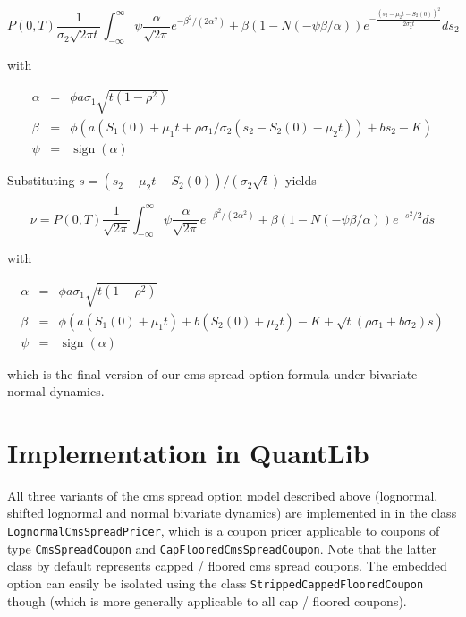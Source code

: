 \documentclass{amsart}
\theoremstyle{plain}
\numberwithin{equation}{section}
\DeclareMathOperator{\sign}{sign}
\begin{document}
\begin{equation}
P(0,T) \frac{1}{\sigma_2\sqrt{2\pi t}} \int_{-\infty}^\infty \psi\frac{\alpha}{\sqrt{2\pi}}e^{-\beta^2/(2\alpha^2)}+\beta(1-N(-\psi\beta/\alpha))e^{-\frac{(s_2-\mu_2t-S_2(0))^2}{2\sigma_2^2 t}} ds_2
\end{equation}

with

\begin{eqnarray}
\alpha &=& \phi a \sigma_1 \sqrt{t(1-\rho^2)} \\
\beta &=& \phi \left( a (S_1(0) + \mu_1 t + \rho\sigma_1/\sigma_2(s_2- S_2(0) - \mu_2t)) + bs_2 - K \right) \\
\psi &=& \sign(\alpha)
\end{eqnarray}

Substituting $s = (s_2 - \mu_2t - S_2(0)) / (\sigma_2\sqrt{t})$ yields

\begin{equation}
\nu = P(0,T) \frac{1}{\sqrt{2\pi}} \int_{-\infty}^\infty \psi\frac{\alpha}{\sqrt{2\pi}}e^{-\beta^2/(2\alpha^2)}+\beta(1-N(-\psi\beta/\alpha))e^{-s^2/2} ds
\end{equation}

with

\begin{eqnarray}
\alpha &=& \phi a \sigma_1 \sqrt{t(1-\rho^2)} \\
\beta &=& \phi \left(a (S_1(0) + \mu_1 t) + b (S_2(0) + \mu_2t) - K +  \sqrt{t}(\rho\sigma_1+b\sigma_2) s \right) \\
\psi &=& \sign(\alpha)
\end{eqnarray}

which is the final version of our cms spread option formula under bivariate normal dynamics.

\section{Implementation in QuantLib}

All three variants of the cms spread option model described above (lognormal, shifted lognormal and normal bivariate dynamics) are implemented in \cite{ql} in the class \verb+LognormalCmsSpreadPricer+, which is a coupon pricer applicable to coupons of type \verb+CmsSpreadCoupon+ and \verb+CapFlooredCmsSpreadCoupon+. Note that the latter class by default represents capped / floored cms spread coupons. The embedded option can easily be isolated using the class \verb+StrippedCappedFlooredCoupon+ though (which is more generally applicable to all cap / floored coupons).
\end{document}
